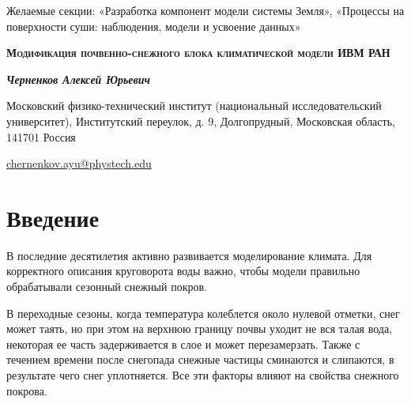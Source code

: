 \documentclass[a4paper, fontsize=12pt]{scrartcl}
\begin{document}
\begin{raggedright}
Желаемые секции: «Разработка компонент модели системы Земля», «Процессы на поверхности суши: наблюдения, модели и усвоение данных»
\end{raggedright}


\begin{center}
    \Large
    \textbf{\textsc{Модификация почвенно-снежного блока климатической модели ИВМ РАН}}
    \normalsize 
    
%    
%    
%    
%    
%    
%    
%    

        \textbf{\textit{Черненков Алексей Юрьевич}}
    
        Московский физико-технический институт (национальный исследовательский университет), Институтский переулок, д. 9, Долгопрудный, Московская область, 141701 Россия
    
        \url{chernenkov.ayu@phystech.edu}
\end{center}







\section{Введение}

В последние десятилетия активно развивается моделирование климата. Для корректного описания круговорота воды важно, чтобы модели правильно обрабатывали сезонный снежный покров.

В переходные сезоны, когда температура колеблется около нулевой отметки, снег может таять, но при этом на верхнюю границу почвы уходит не вся талая вода, некоторая ее часть задерживается в слое и может перезамерзать. Также с течением времени после снегопада снежные частицы сминаются и слипаются, в результате чего снег уплотняется. Все эти факторы влияют на свойства снежного покрова. 
\end{document}
